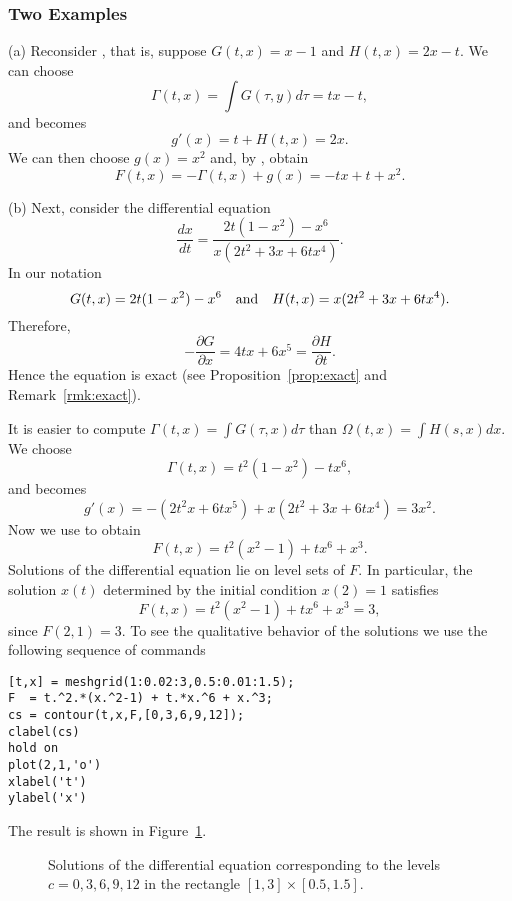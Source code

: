 \documentclass{ximera}
\begin{document}
\subsubsection*{Two Examples}

\noindent (a) Reconsider , that is, suppose $G(t,x)=x-1$ and 
$H(t,x)=2x-t$.  We can choose
\[
\Gamma(t,x)=\int G(\tau,y)d\tau = tx-t,
\]
and  becomes
\[
g'(x) = t + H(t,x) = 2x.
\]
We can then choose $g(x)=x^2$ and, by , obtain
\[
F(t,x) = -\Gamma(t,x) + g(x) = -tx + t + x^2.
\]

\noindent (b) Next, consider the differential equation
\begin{equation}  \label{eq:exacex2}
\frac{dx}{dt} = \frac{2t(1-x^2)-x^6}{x(2t^2+3x+6tx^4)}.
\end{equation}
In our notation
\[
G(t,x) = 2t(1-x^2)-x^6 \quad\mbox{and}\quad H(t,x) = x(2t^2+3x+6tx^4).
\]
Therefore, 
\[
-\frac{\partial G}{\partial x} = 4tx + 6x^5 = 
\frac{\partial H}{\partial t}.
\]
Hence the equation is exact (see Proposition~\ref{prop:exact} and 
Remark~\ref{rmk:exact}).  

It is easier to compute $\Gamma(t,x)=\int G(\tau,x) d\tau$ than 
$\Omega(t,x)=\int H(s,x)dx$.  We choose 
\[
\Gamma(t,x) = t^2(1-x^2) - tx^6,
\]
and  becomes
\[
g'(x) = -(2t^2 x + 6tx^5) + x(2t^2+3x+6tx^4) = 3x^2.
\]
Now we use  to obtain
\[
F(t,x) = t^2(x^2-1) + tx^6 + x^3.
\]
Solutions of the differential equation  lie on
level sets of $F$.  In particular, the solution $x(t)$
determined by the initial condition $x(2)=1$ satisfies 
\[
F(t,x)=t^2(x^2-1) + tx^6 + x^3 = 3,
\]
since $F(2,1)=3$.  To see the qualitative behavior of the
solutions we use the following sequence 
of \Matlab commands
\begin{verbatim}
[t,x] = meshgrid(1:0.02:3,0.5:0.01:1.5);
F  = t.^2.*(x.^2-1) + t.*x.^6 + x.^3;
cs = contour(t,x,F,[0,3,6,9,12]);
clabel(cs)
hold on
plot(2,1,'o')                  
xlabel('t')
ylabel('x')
\end{verbatim}
The result is shown in Figure~\ref{Fig:contour3}.  

\begin{figure}[htb]
  \centerline{%
  }
  \caption{Solutions of the differential equation
\protect{}
  corresponding to the levels $c=0,3,6,9,12$ in the rectangle
  $[1,3]\times [0.5,1.5]$.}
\label{Fig:contour3}
\end{figure}
\end{document}
